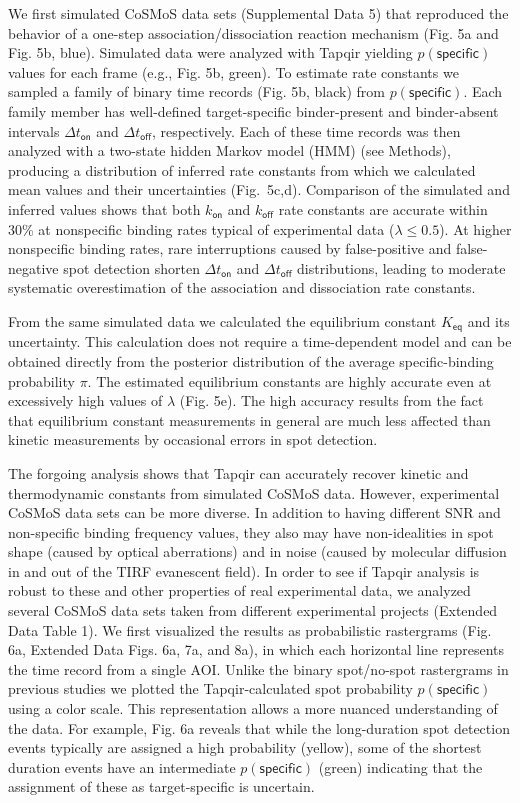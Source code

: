 We first simulated CoSMoS data sets (Supplemental Data 5) that reproduced the behavior of a one-step association/dissociation reaction mechanism (Fig. 5a and Fig. 5b, blue). Simulated data were analyzed with Tapqir yielding $p(\mathsf{specific})$ values for each frame (e.g., Fig. 5b, green). To estimate rate constants we sampled a family of binary time records (Fig. 5b, black) from $p(\mathsf{specific})$. Each family member has well-defined target-specific binder-present and binder-absent intervals $\Delta t_\mathsf{on}$ and $\Delta t_\mathsf{off}$, respectively. Each of these time records was then analyzed with a two-state hidden Markov model (HMM) (see Methods), producing a distribution of inferred rate constants from which we calculated mean values and their uncertainties (Fig.~5c,d). Comparison of the simulated and inferred values shows that both $k_\mathsf{on}$ and $k_\mathsf{off}$ rate constants are accurate within 30\% at nonspecific binding rates typical of experimental data ($\lambda \leq 0.5$). At higher nonspecific binding rates, rare interruptions caused by false-positive and false-negative spot detection shorten $\Delta t_\mathsf{on}$ and $\Delta t_\mathsf{off}$ distributions, leading to moderate systematic overestimation of the association and dissociation rate constants.

From the same simulated data we calculated the equilibrium constant $K_\mathsf{eq}$ and its uncertainty. This calculation does not require a time-dependent model and can be obtained directly from the posterior distribution of the average specific-binding probability $\pi$. The estimated equilibrium constants are highly accurate even at excessively high values of $\lambda$ (Fig. 5e).  The high accuracy results from the fact that equilibrium constant measurements in general are much less affected than kinetic measurements by occasional errors in spot detection. 

The forgoing analysis shows that Tapqir can accurately recover kinetic and thermodynamic constants from simulated CoSMoS data.  However, experimental CoSMoS data sets can be more diverse.  In addition to having different SNR and non-specific binding frequency values, they also may have non-idealities in spot shape (caused by optical aberrations) and in noise (caused by molecular diffusion in and out of the TIRF evanescent field).  In order to see if Tapqir analysis is robust to these and other properties of real experimental data, we analyzed several CoSMoS data sets taken from different experimental projects (Extended Data Table 1). We first visualized the results as probabilistic rastergrams (Fig. 6a, Extended Data Figs. 6a, 7a, and 8a), in which each horizontal line represents the time record from a single AOI.  Unlike the binary spot/no-spot rastergrams in previous studies \cite{Friedman2013-sf,Rosen2020-zn} we plotted the Tapqir-calculated spot probability $p(\mathsf{specific})$ using a color scale.  This representation allows a more nuanced understanding of the data.  For example, Fig. 6a reveals that while the long-duration spot detection events typically are assigned a high probability (yellow), some of the shortest duration events have an intermediate $p(\mathsf{specific})$ (green) indicating that the assignment of these as target-specific is uncertain.  

